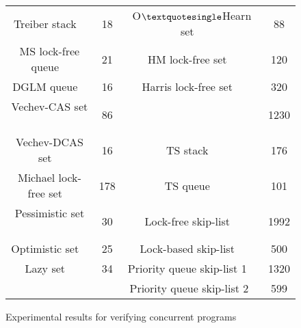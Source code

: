\begin{figure}[]
\begin{tabular}{|c | c || c | c |}
\textsf{Treiber stack  ~\cite{Treiber:stack}} & \textsf {18} & \textsf {O$\textquotesingle $Hearn set  ~\cite{OHearnlist}} & \textsf{88}  \\
\textsf{MS lock-free queue  ~\cite{MS:QueueAlgorithms}}& \textsf{21} & \textsf{HM lock-free set  ~\cite{ArtOfMpP} } & \textsf{120}  \\
\textsf{DGLM queue  ~\cite{Doherty:lockfree}}&  \textsf {16} & \textsf{Harris lock-free set  ~\cite{Harris:list}} & \textsf{320}  \\
\textsf{Vechev-CAS set  ~\cite{Vechev:list}}  & \textsf{86} &  \textsf{Unordered set  ~\cite{Zhang:unorderedlist} & \textsf{1230} \\
\cline{3-4}
\textsf{Vechev-DCAS set  ~\cite{Vechev:list}}   & \textsf{16} & \textsf{TS stack  ~\cite{ts-stack}}  & \textsf{176} \\
\textsf{Michael lock-free set ~\cite{Michael:list}}  & \textsf{178} & \textsf{TS queue  ~\cite{ts-stack}} & \textsf{101} \\
\cline{3-4}
\textsf{Pessimistic set  ~\cite{ArtOfMpP}}&\textsf{30} & \textsf{Lock-free skip-list   ~\cite{ArtOfMpP}}& \textsf{1992} \\
\textsf{Optimistic set ~\cite{ArtOfMpP}}& \textsf{25} & \textsf{Lock-based skip-list ~\cite{lockskiplist}}& \textsf{500} \\
\textsf{Lazy set ~\cite{Lazyset}}  & \textsf {34} & \textsf{Priority queue skip-list 1 ~\cite{Shavit:ElimQueue}} &\textsf{1320} \\
& & \textsf{Priority queue skip-list 2~\cite{Linden:opodis13}}  &  \textsf{599} \\
\hline
\end{tabular}

\caption{Experimental results for verifying concurrent programs}
\label{Experiments:fig}
\end{figure}
